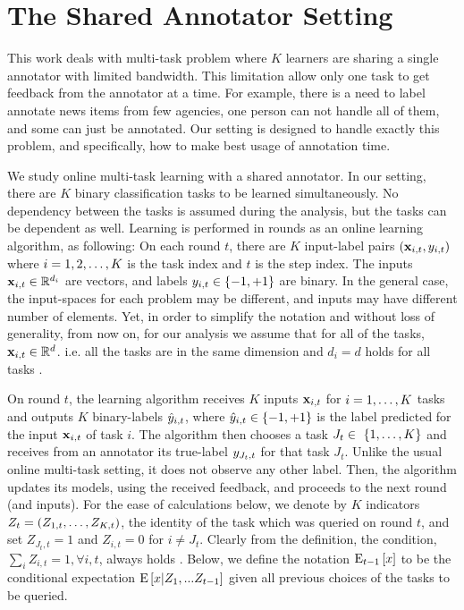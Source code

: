 \chapter{The Shared Annotator Setting}


This work deals with multi-task problem where $K$ learners are sharing a single annotator with 
limited bandwidth. This limitation allow only one task to get feedback from the annotator at a time. 
For example, there is a need to label annotate news items from few agencies, one person can not 
handle all of them, and some can just be annotated. 
Our setting is designed to handle exactly this problem, and specifically, how to make best usage of 
annotation time. 

We study online multi-task learning with a shared annotator. In our setting, there are
$K$  binary classification tasks to be learned simultaneously. 
No dependency between the tasks is assumed during the analysis, but the tasks can be dependent as well. 
Learning is performed in rounds as an online learning algorithm, as following: 
On each round $t$, there are $K$ input-label pairs
$(\mathbf{x}_{i,t},y_{i,t})$ where $i=1,2, \ldots , K$ is the task index and $t$ is the step index. The inputs $\mathbf{x}_{i,t}\in\mathbb{R}^{d_i}$ are
vectors, and labels  $y_{i,t}\in\{-1,+1\}$ are binary. In the general
case, the input-spaces for each problem may be different, and inputs may
have different number of elements. Yet, in order to  simplify the notation and without loss of generality,  from now
on, for our analysis we assume that for all of the tasks, $\mathbf{x}_{i,t}\in\mathbb{R}^{d}$. i.e. all the tasks are in the same dimension and   $d_i = d$ holds for all tasks . 


On round $t$, the learning algorithm receives $K$ inputs $\mathbf{x}_{i,t}$
for $i=1 , \ldots , K$ tasks and outputs $K$ binary-labels $\hat{y}_{i,t}$, where
$\hat{y}_{i,t}\in\{-1,+1\}$ is the label predicted for the input
$\mathbf{x}_{i,t}$ of task $i$. The algorithm then chooses a task $J_t \in\
\{1 , \ldots , K\}$ and receives from an annotator its true-label
$y_{J_t,t}$ for that task $J_t$. Unlike the usual online multi-task setting, it  does not observe any other
label. Then, the algorithm updates its models, using the received feedback, and proceeds to the
next round (and inputs).  For the ease of calculations below, we denote
by $K$ indicators $Z_t=\left({ Z_{1,t} , \ldots , Z_{K,t}}\right)$, the
identity of the task which was queried on round $t$, and set
$Z_{J_t,t}=1$ and $Z_{i,t}=0$ for $i\ne J_t$. Clearly from the definition, the condition, $\sum_i
Z_{i,t}=1 ,\forall{i,t}$, always holds . Below, we define the notation ${\rm E}_{t-1}\left[{x}\right]$ to be the
conditional expectation ${\rm E}\left[{x \vert Z_{1},...Z_{t-1}}\right]$ given all
previous choices of the tasks to be queried.


